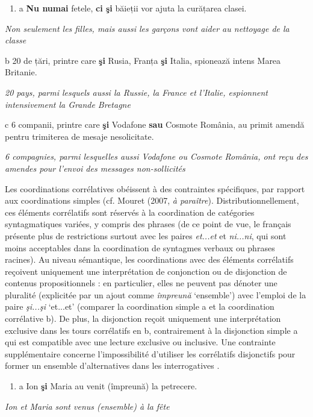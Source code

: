 \begin{enumerate}
\item \label{bkm:Ref301458422}a  \textbf{Nu numai} fetele, \textbf{ci şi} băieții vor ajuta la curățarea clasei.


\end{enumerate}
    \textit{Non seulement les filles, mais aussi les garçons vont aider au nettoyage de la classe}

  b  20 de țări, printre care \textbf{şi} Rusia, Franța \textbf{şi} Italia, spionează intens Marea Britanie.

{\itshape
20 pays, parmi lesquels aussi la Russie, la France et l'Italie, espionnent intensivement la Grande Bretagne}

  c  6 companii, printre care \textbf{şi} Vodafone \textbf{sau} Cosmote România, au primit amendă pentru trimiterea de mesaje nesolicitate.

\textit{6 compagnies, parmi lesquelles aussi Vodafone ou Cosmote România, ont reçu des amendes pour l'envoi des messages non-sollicités}   

Les coordinations corrélatives obéissent à des contraintes spécifiques, par rapport aux coordinations simples (cf. Mouret (2007, \textit{à paraître}). Distributionnellement, ces éléments corrélatifs sont réservés à la coordination de catégories syntagmatiques variées, y compris des phrases (de ce point de vue, le français présente plus de restrictions surtout avec les paires \textit{et...et} et \textit{ni...ni}, qui sont moins acceptables dans la coordination de syntagmes verbaux ou phrases racines). Au niveau sémantique, les coordinations avec des éléments corrélatifs reçoivent uniquement une interprétation de conjonction ou de disjonction de contenus propositionnels : en particulier, elles ne peuvent pas dénoter une pluralité (explicitée par un ajout comme \textit{împreună} `ensemble') avec l'emploi de la paire \textit{şi...şi} `et...et' (comparer la coordination simple a et la coordination corrélative b). De plus, la disjonction reçoit uniquement une interprétation exclusive dans les tours corrélatifs en b, contrairement à la disjonction simple a qui est compatible avec une lecture exclusive ou inclusive. Une contrainte supplémentaire concerne l'impossibilité d'utiliser les corrélatifs disjonctifs pour former un ensemble d'alternatives dans les interrogatives .


\begin{enumerate}
\item \label{bkm:Ref301505562}a  Ion \textbf{şi} Maria au venit (împreună) la petrecere.


\end{enumerate}
{\itshape
Ion et Maria sont venus (ensemble) à la fête}

